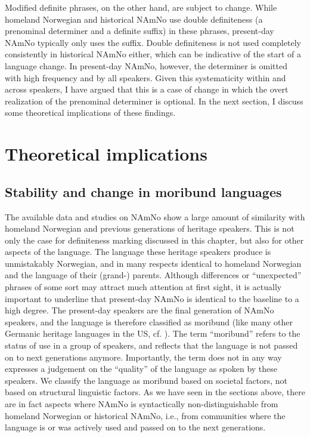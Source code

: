 \documentclass[output=paper]{langscibook}
\begin{document}
Modified definite phrases, on the other hand, are subject to change. While homeland Norwegian and historical NAmNo use double definiteness (a prenominal determiner and a definite suffix) in these phrases, present-day NAmNo typically only uses the suffix. Double definiteness is not used completely consistently in historical NAmNo either, which can be indicative of the start of a language change. In present-day NAmNo, however, the determiner is omitted with high frequency and by all speakers. Given this systematicity within and across speakers, I have argued that this is a case of change in which the overt realization of the prenominal determiner is optional. In the next section, I discuss some theoretical implications of these findings.
 

\section{Theoretical implications} \label{Sect-TheoreticalImpl}
\subsection{Stability and change in moribund languages}
The available data and studies on NAmNo show a large amount of similarity with homeland Norwegian and previous generations of heritage speakers. This is not only the case for definiteness marking discussed in this chapter, but also for other aspects of the language. The language these heritage speakers produce is unmistakably Norwegian, and in many respects identical to homeland Norwegian and the language of their \mbox{(grand-)} parents. Although differences or ``unexpected'' phrases of some sort may attract much attention at first sight, it is actually important to underline that present-day NAmNo is identical to the baseline to a high degree. The present-day speakers are the final generation of NAmNo speakers, and the language is therefore classified as moribund (like many other Germanic heritage languages in the US, cf. \citealt{PutnamEtAl2018}). The term “moribund” refers to the status of use in a group of speakers, and reflects that the language is not passed on to next generations anymore. Importantly, the term does not in any way expresses a judgement on the ``quality'' of the language as spoken by these speakers. We classify the language as moribund based on societal factors, not based on structural linguistic factors. As we have seen in the sections above, there are in fact aspects where NAmNo is syntactically non-distinguishable from homeland Norwegian or historical NAmNo, i.e., from communities where the language is or was actively used and passed on to the next generations.
 
\end{document}
